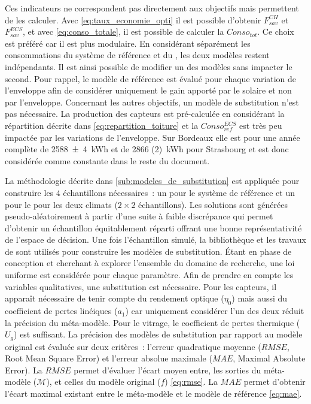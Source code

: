 Ces indicateurs ne correspondent pas directement aux objectifs mais permettent de les calculer.
Avec \eqref{eq:taux_economie_opti} il est possible d’obtenir $F_{sav}^{CH}$ et $F_{sav}^{ECS}$,
et avec \eqref{eq:conso_totale}, il est possible de calculer la $Conso_{tot}$.
Ce choix est préféré car il est plus modulaire. En considérant séparément les consommations
du système de référence et du , les deux modèles restent indépendants. Il est
ainsi possible de modifier un des modèles sans impacter le second. Pour rappel, le
modèle de référence est évalué pour chaque variation de l’enveloppe afin de considérer
uniquement le gain apporté par le solaire et non par l’enveloppe.
Concernant les autres objectifs, un modèle de substitution n’est pas nécessaire. La
production des capteurs  est pré-calculée en considérant la répartition décrite
dans \eqref{eq:repartition_toiture} et la $Conso_{ref}^{ECS}$ est très peu impactée par
les variations de l’enveloppe. Sur Bordeaux elle est pour une année complète de \SI{2588(4)}{kWh}
et de \SI{2866 (2)}{kWh} pour Strasbourg et est donc considérée comme constante
dans le reste du document.

La méthodologie décrite dans \ref{sub:modeles_de_substitution} est appliquée pour
construire les $4$ échantillons nécessaires~: un pour le système de référence et un pour
le  pour les deux climats ($2 \times 2$ échantillons). Les solutions sont
générées pseudo-aléatoirement à partir d’une suite à faible discrépance qui permet
d’obtenir un échantillon équitablement réparti offrant une bonne représentativité de
l’espace de décision. Une fois l’échantillon simulé, la bibliothèque
 et les travaux de \textcite{Merheb2013}
sont utilisés pour construire les modèles de substitution. Étant en phase de conception
et cherchant à explorer l’ensemble du domaine de recherche, une loi uniforme est
considérée pour chaque paramètre. Afin de prendre en compte les variables qualitatives,
une substitution est nécessaire. Pour les capteurs, il apparaît nécessaire de tenir compte
du rendement optique ($\eta_{0}$) mais aussi du coefficient de pertes linéiques ($a_{1}$)
car uniquement considérer l’un des deux réduit la précision du méta-modèle. Pour le
vitrage, le coefficient de pertes thermique ($U_{g}$) est suffisant. La précision des
modèles de substitution par rapport au modèle original est évaluée sur deux critères~:
l’erreur quadratique moyenne ($RMSE$, Root Mean Square Error) et l’erreur absolue maximale
($MAE$, Maximal Absolute Error). La $RMSE$ permet d’évaluer l’écart moyen entre, les
sorties du méta-modèle ($\mathcal{M}$), et celles du modèle original ($f$)
\eqref{eq:rmse}. La $MAE$ permet d’obtenir l’écart maximal existant entre le méta-modèle
et le modèle de référence \eqref{eq:mae}.

